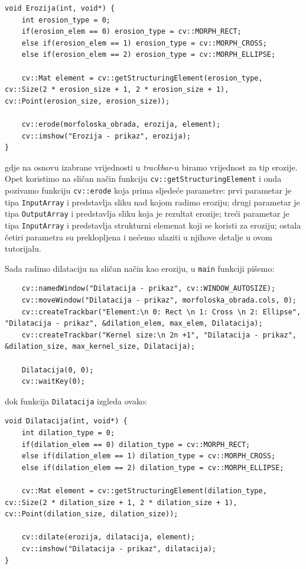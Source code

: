 \documentclass[a4paper, 12pt]{article}
\begin{document}
\begin{lstlisting}
void Erozija(int, void*) {
    int erosion_type = 0;
    if(erosion_elem == 0) erosion_type = cv::MORPH_RECT;
    else if(erosion_elem == 1) erosion_type = cv::MORPH_CROSS;
    else if(erosion_elem == 2) erosion_type = cv::MORPH_ELLIPSE;

    cv::Mat element = cv::getStructuringElement(erosion_type, cv::Size(2 * erosion_size + 1, 2 * erosion_size + 1), cv::Point(erosion_size, erosion_size));

    cv::erode(morfoloska_obrada, erozija, element);
    cv::imshow("Erozija - prikaz", erozija);
}
\end{lstlisting}

gdje na osnovu izabrane vrijednosti u \textit{trackbar}-u biramo vrijednost za tip erozije. Opet koristimo na sličan način funkciju \lstinline{cv::getStructuringElement} i onda pozivamo funkciju \lstinline{cv::erode} koja prima sljedeće parametre: prvi parametar je tipa \lstinline{InputArray} i predstavlja sliku nad kojom radimo eroziju; drugi parametar je tipa \lstinline{OutputArray} i predstavlja sliku koja je rezultat erozije; treći parametar je tipa \lstinline{InputArray} i predstavlja strukturni elemenat koji se koristi za eroziju; ostala četiri parametra su preklopljena i nećemo ulaziti u njihove detalje u ovom tutorijalu.

Sada radimo dilataciju na sličan način kao eroziju, u \lstinline{main} funkciji pišemo:

\begin{lstlisting}
    cv::namedWindow("Dilatacija - prikaz", cv::WINDOW_AUTOSIZE);
    cv::moveWindow("Dilatacija - prikaz", morfoloska_obrada.cols, 0);
    cv::createTrackbar("Element:\n 0: Rect \n 1: Cross \n 2: Ellipse", "Dilatacija - prikaz", &dilation_elem, max_elem, Dilatacija);
    cv::createTrackbar("Kernel size:\n 2n +1", "Dilatacija - prikaz", &dilation_size, max_kernel_size, Dilatacija);

    Dilatacija(0, 0);
    cv::waitKey(0);
\end{lstlisting}

dok funkcija \lstinline{Dilatacija} izgleda ovako:

\begin{lstlisting}
void Dilatacija(int, void*) {
    int dilation_type = 0;
    if(dilation_elem == 0) dilation_type = cv::MORPH_RECT;
    else if(dilation_elem == 1) dilation_type = cv::MORPH_CROSS;
    else if(dilation_elem == 2) dilation_type = cv::MORPH_ELLIPSE;

    cv::Mat element = cv::getStructuringElement(dilation_type, cv::Size(2 * dilation_size + 1, 2 * dilation_size + 1), cv::Point(dilation_size, dilation_size));

    cv::dilate(erozija, dilatacija, element);
    cv::imshow("Dilatacija - prikaz", dilatacija);
}
\end{lstlisting}
\end{document}
